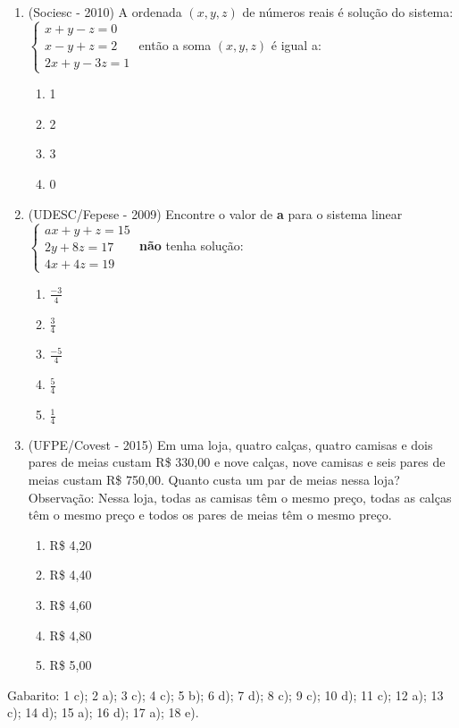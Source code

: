 \begin{enumerate}
 \item (Sociesc - 2010) A ordenada $(x, y, z)$ de números reais é solução do sistema:
  $\begin{cases}
    x+y-z=0 \\
    x-y+z=2 \\
    2x+y-3z=1
   \end{cases}$ então a soma $(x, y, z)$ é igual a:
  \begin{enumerate}
  \item 1
  \item 2
  \item 3
  \item 0
 \end{enumerate}
 
 \item (UDESC/Fepese - 2009) Encontre o valor de \textbf{a} para o sistema linear 
 $\begin{cases}
    ax+y+z=15 \\
    2y+8z=17 \\
    4x+4z=19
   \end{cases}$
 \textbf{não} tenha solução:
  \begin{enumerate}
  \item $\frac{-3}{4}$
  \item $\frac{3}{4}$
  \item $\frac{-5}{4}$
  \item $\frac{5}{4}$
  \item $\frac{1}{4}$
 \end{enumerate}
 
 \item (UFPE/Covest - 2015) Em uma loja, quatro calças, quatro camisas e dois pares de meias custam R\$ 330,00 e nove calças, nove camisas e seis pares de meias custam R\$ 750,00. Quanto custa um par de meias nessa loja? Observação: Nessa loja, todas as camisas têm o mesmo preço, todas as calças têm o mesmo preço e todos os pares de meias têm o mesmo preço. 
 \begin{enumerate}
  \item R\$ 4,20
  \item R\$ 4,40
  \item R\$ 4,60
  \item R\$ 4,80
  \item R\$ 5,00
 \end{enumerate}

\end{enumerate}

Gabarito: 1 c); 2 a); 3 c); 4 c); 5 b); 6 d); 7 d); 8 c); 9 c); 10 d); 11 c); 12 a); 13 c); 14 d); 15 a); 16 d); 17 a); 18 e).

